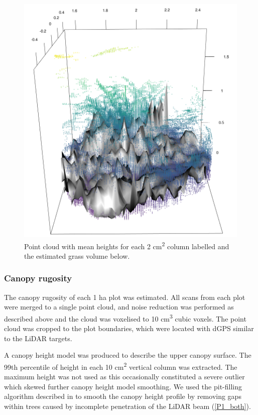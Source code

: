 \documentclass[11pt,a4paper]{article}
\begin{document}
\begin{figure}[H]
\centering
	\includegraphics[width=\textwidth]{grass_3d}
	\caption{Point cloud with mean heights for each 2 cm\textsuperscript{2} column labelled and the estimated grass volume below.}
	\label{grass_3d}
\end{figure}

\subsubsection{Canopy rugosity}

The canopy rugosity of each 1 ha plot was estimated. All scans from each plot were merged to a single point cloud, and noise reduction was performed as described above and the cloud was voxelised to 10 cm\textsuperscript{3} cubic voxels. The point cloud was cropped to the plot boundaries, which were located with dGPS similar to the LiDAR targets. 

A canopy height model was produced to describe the upper canopy surface. The 99th percentile of height in each 10 cm\textsuperscript{2} vertical column was extracted. The maximum height was not used as this occasionally constituted a severe outlier which skewed further 
canopy height model smoothing. We used the pit-filling algorithm described in \citet{Khosravipour2014} to smooth the canopy height profile by removing gaps within trees caused by incomplete penetration of the LiDAR beam (\autoref{P1_both}).
\end{document}
